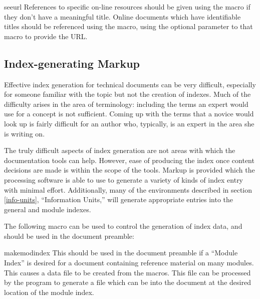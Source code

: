 \documentclass{howto}
\begin{document}
    \begin{macrodesc}{seeurl}{}
      References to specific on-line resources should be given using
      the  macro if they don't have a meaningful title.
      Online documents which have identifiable titles should be
      referenced using the  macro, using the optional
      parameter to that macro to provide the URL.
    \end{macrodesc}


  \subsection{Index-generating Markup \label{indexing}}

    Effective index generation for technical documents can be very
    difficult, especially for someone familiar with the topic but not
    the creation of indexes.  Much of the difficulty arises in the
    area of terminology: including the terms an expert would use for a
    concept is not sufficient.  Coming up with the terms that a novice
    would look up is fairly difficult for an author who, typically, is
    an expert in the area she is writing on.

    The truly difficult aspects of index generation are not areas with
    which the documentation tools can help.  However, ease
    of producing the index once content decisions are made is within
    the scope of the tools.  Markup is provided which the processing
    software is able to use to generate a variety of kinds of index
    entry with minimal effort.  Additionally, many of the environments
    described in section \ref{info-units}, ``Information Units,'' will
    generate appropriate entries into the general and module indexes.

    The following macro can be used to control the generation of index
    data, and should be used in the document preamble:

    \begin{macrodesc}{makemodindex}{}
      This should be used in the document preamble if a ``Module
      Index'' is desired for a document containing reference material
      on many modules.  This causes a data file
       to be created from the
       macros.  This file can be processed by the
       program to generate a file which can be
       into the document at the desired location of the
      module index.
    \end{macrodesc}
\end{document}
